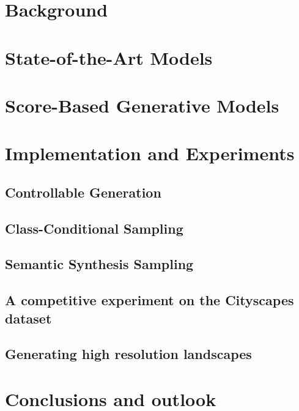 \documentclass[a4paper, 12pt, oneside]{scrbook}
\begin{document}
\chapter{Background}





\chapter{State-of-the-Art Models}




\chapter{Score-Based Generative Models} %







\chapter{Implementation and Experiments}
\section{Controllable Generation} %
\section{Class-Conditional Sampling} %
\section{Semantic Synthesis Sampling} %
\section{A competitive experiment on the Cityscapes dataset} %
\section{Generating high resolution landscapes} %

\chapter{Conclusions and outlook} %
\appendix 

\end{document}
